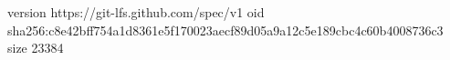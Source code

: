 version https://git-lfs.github.com/spec/v1
oid sha256:c8e42bff754a1d8361e5f170023aecf89d05a9a12c5e189cbc4c60b4008736c3
size 23384
